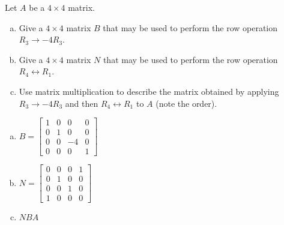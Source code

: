 
\begin{exerciseStatement}


Let \(A\) be a \(4 \times 4\) matrix.


\begin{enumerate}[(a)]
\item Give a \(4 \times 4\) matrix \(B\) that may be used to perform the row operation \( R_3 \to -4R_3 \).
\item Give a \(4 \times 4\) matrix \(N\) that may be used to perform the row operation \( R_4 \leftrightarrow R_1 \).
\item Use matrix multiplication to describe the matrix obtained by applying \( R_3 \to -4R_3 \) and then \( R_4 \leftrightarrow R_1 \) to \(A\) (note the order). 
\end{enumerate}
    
\end{exerciseStatement}
    
\begin{exerciseAnswer} 

\begin{enumerate}[(a)]
\item \(B= \left[\begin{array}{cccc}
1 & 0 & 0 & 0 \\
0 & 1 & 0 & 0 \\
0 & 0 & -4 & 0 \\
0 & 0 & 0 & 1
\end{array}\right] \)
\item \(N= \left[\begin{array}{cccc}
0 & 0 & 0 & 1 \\
0 & 1 & 0 & 0 \\
0 & 0 & 1 & 0 \\
1 & 0 & 0 & 0
\end{array}\right] \)
\item \(NBA\)
\end{enumerate}
    
\end{exerciseAnswer}
    
